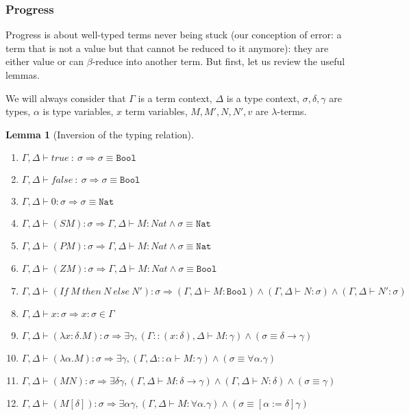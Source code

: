 \documentclass{article}
\newtheorem{lemma}[theorem]{Lemma}
\begin{document}
    \subsubsection{Progress}
    Progress is about well-typed terms never being stuck (our conception of error: a term that is not a value but that cannot be reduced to it anymore): they are either value or can $\beta$-reduce into another term. But first, let us review the useful lemmas. \par We will always consider that $\Gamma$ is a term context, $\Delta$ is a type context, $\sigma, \delta, \gamma $ are types, $\alpha$ is type variables, $x$ term variables, $M, M', N, N', v$ are $\lambda$-terms.
    \begin{lemma}[Inversion of the typing relation]
    \end{lemma}
    \label{inversion}\begin{enumerate}
        \item $\Gamma,\Delta \vdash true \ : \ \sigma \Rightarrow \sigma \equiv \texttt{Bool}$
        \item $\Gamma,\Delta \vdash false \ : \ \sigma \Rightarrow \sigma \equiv \texttt{Bool}$
        \item $\Gamma,\Delta \vdash 0 : \sigma \Rightarrow \sigma \equiv \texttt{Nat}$
        \item $\Gamma,\Delta \vdash (S M):\sigma \Rightarrow \Gamma,\Delta \vdash M:Nat \wedge \sigma \equiv \texttt{Nat}$
        \item $\Gamma,\Delta \vdash (P M):\sigma \Rightarrow \Gamma,\Delta \vdash M:Nat \wedge \sigma \equiv \texttt{Nat}$
        \item $\Gamma,\Delta \vdash (Z M):\sigma \Rightarrow \Gamma,\Delta \vdash M:Nat \wedge \sigma \equiv \texttt{Bool}$
        \item $\Gamma,\Delta \vdash (If \ M \ then \ N \ else \ N'):\sigma \Rightarrow (\Gamma,\Delta \vdash M:\texttt{Bool}) \wedge (\Gamma,\Delta \vdash N:\sigma) \wedge (\Gamma,\Delta \vdash N':\sigma)$
        \item $\Gamma,\Delta \vdash x:\sigma \Rightarrow x : \sigma \in \Gamma$
        \item $\Gamma,\Delta \vdash (\lambda x : \delta.M) :  \sigma \Rightarrow \exists \gamma, (\Gamma::(x : \delta),\Delta \vdash M : \gamma) \wedge (\sigma \equiv \delta \rightarrow \gamma)$
        \item $\Gamma,\Delta \vdash (\lambda \alpha.M):\sigma \Rightarrow \exists \gamma, (\Gamma,\Delta :: \alpha \vdash M:\gamma) \wedge (\sigma \equiv \forall \alpha. \gamma)$
        \item $\Gamma,\Delta \vdash (M N):\sigma \Rightarrow \exists \delta \gamma, (\Gamma,\Delta \vdash M : \delta \rightarrow \gamma) \wedge (\Gamma,\Delta \vdash N:\delta) \wedge (\sigma \equiv \gamma)$
        \item  $\Gamma,\Delta \vdash (M [\delta]):\sigma \Rightarrow \exists \alpha \gamma, (\Gamma,\Delta \vdash M : \forall \alpha. \gamma) \wedge (\sigma \equiv [\alpha := \delta]\gamma)$
    \end{enumerate}
\end{document}
